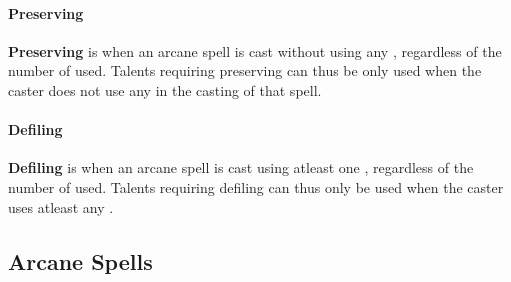 \begin{multicols}{2}
\paragraph{Preserving}
\textbf{Preserving} is when an arcane spell is cast without using any \dark, regardless of the number of \light used.
Talents requiring preserving can thus be only used when the caster does not use any \dark in the casting of that spell.

\paragraph{Defiling}
\textbf{Defiling} is when an arcane spell is cast using atleast one \dark, regardless of the number of \light used.
Talents requiring defiling can thus only be used when the caster uses atleast any \dark.

\end{multicols}
\begin{multicols}{2}
\subsection{Arcane Spells}



%


\end{multicols}

\FloatBarrier
\hrulefill

